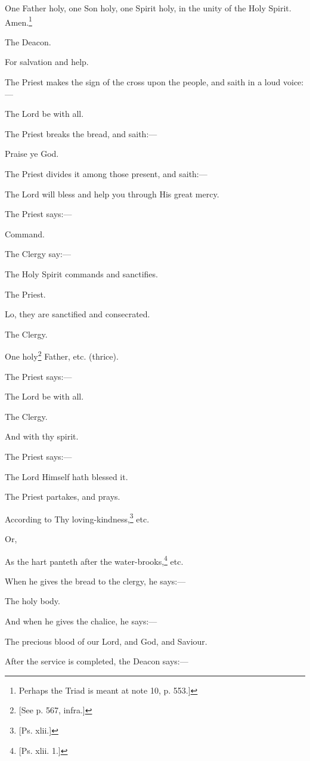One Father holy, one Son holy, one Spirit holy, in the unity of the Holy Spirit. Amen.\footnote{\par  Perhaps the Triad is meant at note 10, p. 553.]}

The Deacon.

For salvation and help.

The Priest makes the sign of the cross upon the people, and saith in a loud voice:—

The Lord be with all.

The Priest breaks the bread, and saith:—

Praise ye God.

The Priest divides it among those present, and saith:—

The Lord will bless and help you through His great mercy.

The Priest says:—

Command.

The Clergy say:—

The Holy Spirit commands and sanctifies.

The Priest.

Lo, they are sanctified and consecrated.

The Clergy.

One holy\footnote{\par{}  [See p. 567, infra.]} Father, etc. (thrice).

The Priest says:—

The Lord be with all.

The Clergy.

And with thy spirit.

The Priest says:—

The Lord Himself hath blessed it.

The Priest partakes, and prays.

According to Thy loving-kindness,\footnote{\par{}  [Ps. xlii.]} etc.

Or,

As the hart panteth after the water-brooks,\footnote{\par{}  [Ps. xlii. 1.]} etc.

When he gives the bread to the clergy, he says:—

The holy body.

And when he gives the chalice, he says:—

The precious blood of our Lord, and God, and Saviour.

After the service is completed, the Deacon says:—

